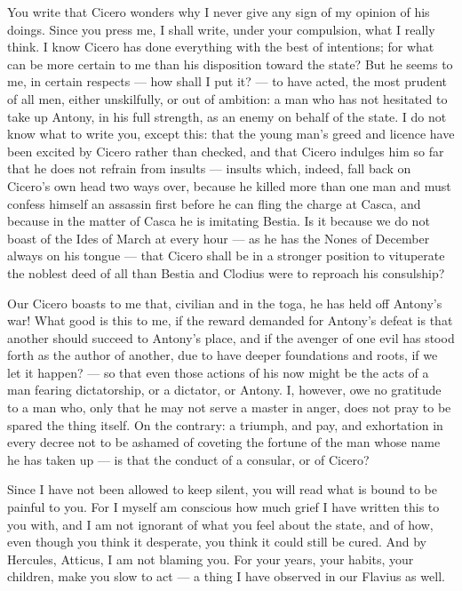 

 You write that Cicero wonders why I never give any sign of my opinion of his doings. Since you press me, I shall write, under your compulsion, what I really think. I know Cicero has done everything with the best of intentions; for what can be more certain to me than his disposition toward the state? But he seems to me, in certain respects --- how shall I put it? --- to have acted, the most prudent of all men, either unskilfully, or out of ambition: a man who has not hesitated to take up Antony, in his full strength, as an enemy on behalf of the state. I do not know what to write you, except this: that the young man's greed and licence have been excited by Cicero rather than checked, and that Cicero indulges him so far that he does not refrain from insults --- insults which, indeed, fall back on Cicero's own head two ways over, because he killed more than one man and must confess himself an assassin first before he can fling the charge at Casca, and because in the matter of Casca he is imitating Bestia. Is it because we do not boast of the Ides of March at every hour --- as he has the Nones of December always on his tongue --- that Cicero shall be in a stronger position to vituperate the noblest deed of all than Bestia and Clodius were to reproach his consulship?

 Our Cicero boasts to me that, civilian and in the toga, he has held off Antony's war! What good is this to me, if the reward demanded for Antony's defeat is that another should succeed to Antony's place, and if the avenger of one evil has stood forth as the author of another, due to have deeper foundations and roots, if we let it happen? --- so that even those actions of his now might be the acts of a man fearing dictatorship, or a dictator, or Antony. I, however, owe no gratitude to a man who, only that he may not serve a master in anger, does not pray to be spared the thing itself. On the contrary: a triumph, and pay, and exhortation in every decree not to be ashamed of coveting the fortune of the man whose name he has taken up --- is that the conduct of a consular, or of Cicero?

 Since I have not been allowed to keep silent, you will read what is bound to be painful to you. For I myself am conscious how much grief I have written this to you with, and I am not ignorant of what you feel about the state, and of how, even though you think it desperate, you think it could still be cured. And by Hercules, Atticus, I am not blaming you. For your years, your habits, your children, make you slow to act --- a thing I have observed in our Flavius as well.

